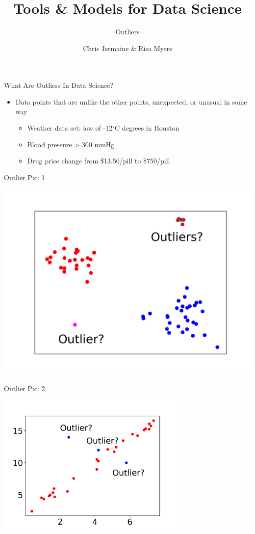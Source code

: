 \documentclass[aspectratio=169]{beamer}
\title[]
{Tools \& Models for Data Science}
\subtitle{Outliers}
\author[]{Chris Jermaine \& Risa Myers}
\institute
{
  Rice University 
}
\date[]{}
\begin{document}
\begin{frame}
 \titlepage
\end{frame}

\begin{frame}{What Are Outliers In Data Science?}

\begin{itemize}
	\item Data points that are unlike the other points, unexpected, or unusual in some way
	\begin{itemize}
		\item Weather data set: low of -12$^{\circ}$C degrees in Houston
		\item Blood pressure > 300 mmHg
		\item Drug price change from \$13.50/pill to \$750/pill
	\end{itemize}
\end{itemize}


\end{frame}
\begin{frame}{Outlier Pic: 1}

\includegraphics[width=.75\textwidth]{lectOutliers/2dOutliers.png}

\end{frame}
\begin{frame}{Outlier Pic: 2}

\includegraphics[width=0.7\textwidth]{lectOutliers/outlier_pic_2.png}

\end{frame}
\end{document}
